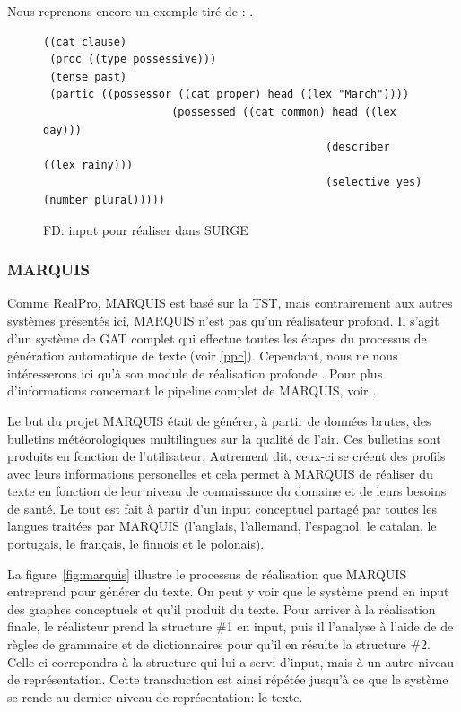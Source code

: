 Nous reprenons encore un exemple tiré de \cite{ReiterBuildingNaturalLanguage2000}: .

\begin{figure}[htb]
 \caption{FD: input pour réaliser  dans SURGE}
 \label{surge}
\begin{lstlisting}[language=mate]
((cat clause)
 (proc ((type possessive)))
 (tense past)
 (partic ((possessor ((cat proper) head ((lex "March"))))
					(possessed ((cat common) head ((lex day)))
											(describer ((lex rainy)))
											(selective yes) (number plural)))))
\end{lstlisting}
\end{figure}

\subsubsection{MARQUIS}\label{sectionmarquis}
Comme RealPro, MARQUIS est basé sur la \ac{TST}, mais contrairement aux autres systèmes présentés ici, MARQUIS n'est pas qu'un réalisateur profond. Il s'agit d'un système de \ac{GAT} complet qui effectue toutes les étapes du processus de génération automatique de texte (voir \ref{ppc}). Cependant, nous ne nous intéresserons ici qu'à son module de réalisation profonde \citep{Lareau2007TowardsAG}. Pour plus d'informations concernant le pipeline complet de MARQUIS, voir \citep{WannerMARQUISGENERATIONUSERTAILORED2010,bohnet07}. 

Le but du projet MARQUIS était de générer, à partir de données brutes, des bulletins météorologiques multilingues sur la qualité de l'air. Ces bulletins sont produits en fonction de l'utilisateur. Autrement dit, ceux-ci se créent des profils avec leurs informations personelles et cela permet à MARQUIS de réaliser du texte en fonction de leur niveau de connaissance du domaine et de leurs besoins de santé. Le tout est fait à partir d'un input conceptuel partagé par toutes les langues traitées par MARQUIS (l'anglais, l'allemand, l'espagnol, le catalan, le portugais, le français, le finnois et le polonais). 

La figure~\ref{fig:marquis} illustre le processus de réalisation que MARQUIS entreprend pour générer du texte. On peut y voir que le système prend en input des graphes conceptuels et qu'il produit du texte. Pour arriver à la réalisation finale, le réalisteur prend la structure \#1 en input, puis il l'analyse à l'aide de de règles de grammaire et de dictionnaires pour qu'il en résulte la structure \#2. Celle-ci correpondra à la structure qui lui a servi d'input, mais à un autre niveau de représentation. Cette transduction est ainsi répétée jusqu'à ce que le système se rende au dernier niveau de représentation: le texte.

